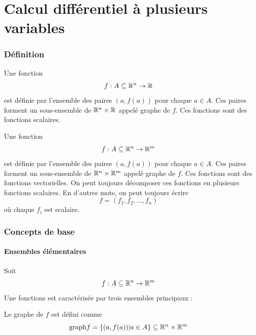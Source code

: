
\part{Calcul différentiel à plusieurs variables}

\section{Définition}


\begin{mydef}
	Une fonction
	\[ f : A \subseteq \mathbb{R}^n \rightarrow \mathbb{R} \]
	est définie par l'ensemble des paires $(a,f(a))$ pour chaque $a \in A$. Ces paires forment un sous-ensemble de $\mathbb{R}^n \times \mathbb{R}$ appelé graphe de $f$. Ces fonctions sont des fonctions scalaires.

	Une fonction
	\[ f : A \subseteq \mathbb{R}^n \rightarrow \mathbb{R}^m \]
	est définie par l'ensemble des paires $(a,f(a))$ pour chaque $a \in A$. Ces paires forment un sous-ensemble de $\mathbb{R}^n \times \mathbb{R}^m$ appelé graphe de $f$. Ces fonctions sont des fonctions vectorielles. On peut toujours décomposer ces fonctions en plusieurs fonctions scalaires. En d'autres mots, on peut toujours écrire
	\[ f = (f_1, f_2, \dots, f_n) \]
	où chaque $f_i$ est scalaire.
\end{mydef}


\section{Concepts de base}

\subsection{Ensembles élémentaires}
Soit
\[ f : A \subseteq \mathbb{R}^n \rightarrow \mathbb{R}^m \]
Une fonctions est caractérisée par trois ensembles principaux :
\begin{mydef} [Graphe de $f$] Le graphe de $f$ est défini comme
	\[ \mathrm{graph} f = \{(a,f(a))| a \in A\} \subseteq \mathbb{R}^n \times \mathbb{R}^m \]
\end{mydef}

